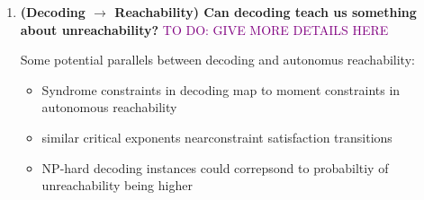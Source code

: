 \documentclass[ a4paper, 
                amsfonts, 
                amssymb, 
                amsmath, 
                reprint, 
                showkeys, 
                nofootinbib,
                superscriptaddress, 
                onecolumn, 
                notitlepage,
                aps,
                pra,
                longbibliography]{revtex4-1}
\newcommand{\tom}[1]{\textcolor{purple}{#1}}
\theoremstyle{definition}
\begin{document}
\begin{enumerate}
Could we explain the gap between MWPM and stat mech model using our reachability criteria? The stat mech model assumes optimal maximum likelihood decoding which may require operations not implementable with autonomous $2$-body Hamiltonians. Filtering out unrealizable (as determined by theorem \ref{2}) corrections could maybe explain this gap or lead to a better decoder?

    \tom{TO DO: GIVE MORE DETAILS HERE}

    \textit{Decoder design}

    We could incorporate the reachability criteria into maximum likelihood decoder to filter out corrections that are difficult to prepare autonomusly. 

    \textit{Possible experiments}
    We could later compare our decoder with MWPM for repetition code, surface code and do some scaling analysis vs distance.

    \textit{Possible hurdles}

    Design of optimal decoders is usually difficult and stat mech decoder is known to be computationally expensive so our decoder could prove to expensive too :(

\item \textbf{(Decoding $\rightarrow$ Reachability) Can decoding teach us something about unreachability?}
    \tom{TO DO: GIVE MORE DETAILS HERE}

    Some potential parallels between decoding and autonomus reachability:
    \begin{itemize}
        \item Syndrome constraints in decoding map to moment constraints in autonomous reachability
        \item similar critical exponents nearconstraint satisfaction transitions
        \item NP-hard decoding instances could correpsond to probabiltiy of unreachability being higher
    \end{itemize}




\end{enumerate}





\end{document}
